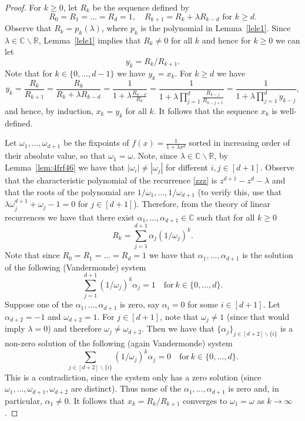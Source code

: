 \documentclass[11pt]{article}
\def\Reals{\mathbb{R}}
\def\Complex{\mathbb{C}}
\begin{document}
\begin{proof}
For $k\geq 0$, let $R_k$ be the sequence defined by
\begin{equation}\label{zzz}
R_0=R_1=\dots=R_d=1, \quad R_{k+1} = R_k + \lambda R_{k-d} \mbox{ for $k\geq d$}.
\end{equation}
Observe that $R_k=p_k(\lambda)$, where $p_k$ is the polynomial in Lemma~\ref{lele1}. Since $\lambda\in\Complex\backslash\Reals$, Lemma~\ref{lele1} implies  that  $R_k\neq 0$ for all $k$
and hence for $k\geq 0$ we can let
\begin{equation}\label{zio}
y_k=R_k/R_{k+1}.
\end{equation}
Note that for $k\in\{0,\dots,d-1\}$ we have $y_k = x_k$. For $k\geq d$ we have
$$
y_{k} = \frac{R_k}{R_{k+1}} = \frac{R_k}{R_k + \lambda R_{k-d}} =  \frac{1}{1 + \lambda \frac{R_{k-d}}{R_{k}}}
= \frac{1}{1+\lambda\prod_{j=1}^d \frac{R_{k-j}}{R_{k-j+1}}}
= \frac{1}{1+\lambda\prod_{j=1}^d y_{k-j}},
$$
and hence, by induction, $x_k = y_k$ for all $k$. It follows that the sequence $x_k$ is well-defined.

Let $\omega_1,\dots,\omega_{d+1}$ be the
fixpoints of $f(x)=\frac{1}{1+\lambda x^d}$  sorted in increasing order of their absolute value, so that $\omega_1=\omega$. Note, since $\lambda\in\Complex\backslash\Reals$, by Lemma~\ref{lem:4frf46} we have that $|\omega_i|\neq |\omega_j|$ for different $i,j\in[d+1]$.  Observe that the characteristic polynomial of the recurrence \eqref{zzz} is $z^{d+1}-z^d-\lambda$ and that the roots of the polynomial are $1/\omega_1,\hdots,1/\omega_{d+1}$ (to verify this, use that $\lambda \omega_j^{d+1}+\omega_j-1=0$ for $j \in [d+1]$). Therefore, from the theory of linear recurrences we have that there exist $\alpha_1,\dots,\alpha_{d+1}\in \Complex$ such that for all $k\geq 0$
$$
R_k = \sum_{j=1}^{d+1} \alpha_j(1/\omega_j)^k.
$$
Note that since $R_0=R_1=\dots=R_d=1$ we have that $\alpha_1,\dots,\alpha_{d+1}$ is the solution of the following
(Vandermonde) system
$$
\sum_{j=1}^{d+1} (1/\omega_j)^k \alpha_j = 1 \quad \mbox{for}\ k\in\{0,\dots,d\}.
$$
Suppose one of the $\alpha_1,\dots,\alpha_{d+1}$ is zero, say $\alpha_{i}=0$ for some $i\in[d+1]$. Let $\alpha_{d+2} = -1$ and $\omega_{d+2}=1$.
For $j\in [d+1]$, note that $\omega_j\neq 1$  (since that would imply $\lambda = 0$) and therefore $\omega_j\neq \omega_{d+2}$.  Then we have that
$\{\alpha_j\}_{j\in [d+2]\backslash\{i\}}$ is a non-zero solution of the following (again Vandermonde) system
\begin{equation}\label{vander}
\sum_{j\in [d+2]\backslash\{i\}} (1/\omega_j)^k \alpha_j = 0 \quad \mbox{for}\ k\in\{0,\dots,d\}.
\end{equation}
This is a contradiction, since the system only has a zero solution (since $\omega_1,\dots,\omega_{d+1},\omega_{d+2}$ are distinct). Thus none of the $\alpha_1,\dots,\alpha_{d+1}$ is zero and, in particular, $\alpha_1\neq 0$. It follows that $x_k=R_k/R_{k+1}$ converges to $\omega_1=\omega$ as $k\rightarrow \infty$.


\end{proof}
\end{document}
